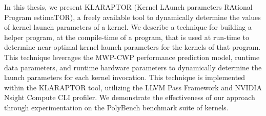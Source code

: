 In this thesis, we present KLARAPTOR (Kernel LAunch parameters RAtional Program estimaTOR), 
a freely available tool to dynamically determine the values of kernel launch parameters of a {\cuda} kernel.
We describe a technique for building a helper program, at the compile-time of a {\cuda} program, 
that is used at run-time to determine near-optimal kernel launch parameters for the kernels of that {\cuda} program.
This technique leverages the MWP-CWP performance prediction model, runtime data parameters, and runtime 
hardware parameters to dynamically determine the launch parameters for each kernel invocation. 
This technique is implemented within the KLARAPTOR tool, utilizing the LLVM Pass Framework 
and NVIDIA Nsight Compute CLI profiler. We demonstrate the effectiveness of our approach through experimentation 
on the PolyBench benchmark suite of {\cuda} kernels.
